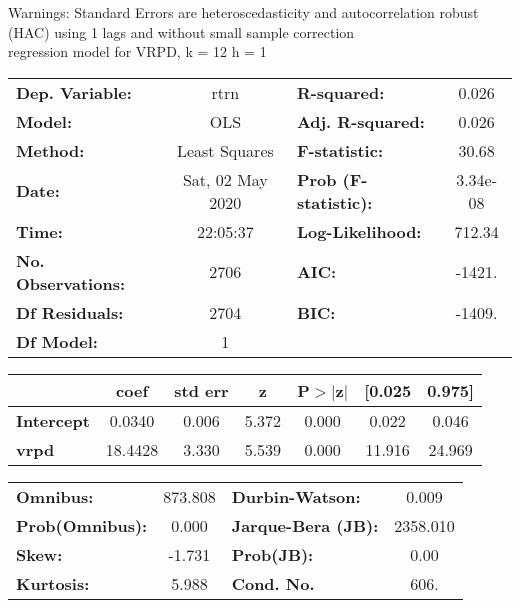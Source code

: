 Warnings: \newline
 [1] Standard Errors are heteroscedasticity and autocorrelation robust (HAC) using 1 lags and without small sample correction\\ 

regression model for VRPD, k = 12 h = 1\begin{center}
\begin{tabular}{lclc}
\toprule
\textbf{Dep. Variable:}    &       rtrn       & \textbf{  R-squared:         } &     0.026   \\
\textbf{Model:}            &       OLS        & \textbf{  Adj. R-squared:    } &     0.026   \\
\textbf{Method:}           &  Least Squares   & \textbf{  F-statistic:       } &     30.68   \\
\textbf{Date:}             & Sat, 02 May 2020 & \textbf{  Prob (F-statistic):} &  3.34e-08   \\
\textbf{Time:}             &     22:05:37     & \textbf{  Log-Likelihood:    } &    712.34   \\
\textbf{No. Observations:} &        2706      & \textbf{  AIC:               } &    -1421.   \\
\textbf{Df Residuals:}     &        2704      & \textbf{  BIC:               } &    -1409.   \\
\textbf{Df Model:}         &           1      & \textbf{                     } &             \\
\bottomrule
\end{tabular}
\begin{tabular}{lcccccc}
                   & \textbf{coef} & \textbf{std err} & \textbf{z} & \textbf{P$> |$z$|$} & \textbf{[0.025} & \textbf{0.975]}  \\
\midrule
\textbf{Intercept} &       0.0340  &        0.006     &     5.372  &         0.000        &        0.022    &        0.046     \\
\textbf{vrpd}      &      18.4428  &        3.330     &     5.539  &         0.000        &       11.916    &       24.969     \\
\bottomrule
\end{tabular}
\begin{tabular}{lclc}
\textbf{Omnibus:}       & 873.808 & \textbf{  Durbin-Watson:     } &    0.009  \\
\textbf{Prob(Omnibus):} &   0.000 & \textbf{  Jarque-Bera (JB):  } & 2358.010  \\
\textbf{Skew:}          &  -1.731 & \textbf{  Prob(JB):          } &     0.00  \\
\textbf{Kurtosis:}      &   5.988 & \textbf{  Cond. No.          } &     606.  \\
\bottomrule
\end{tabular}
\end{center}


